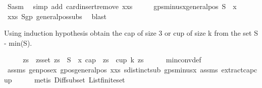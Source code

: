 \begin{isabellebody}
\ S{\isacharunderscore}{\kern0pt}asm\ \isamarkupfalse%
\ {\isacharparenleft}{\kern0pt}simp\ add{\isacharcolon}{\kern0pt}\ card{\isachardot}{\kern0pt}insert{\isacharunderscore}{\kern0pt}remove\ x{\isacharunderscore}{\kern0pt}xs{\isacharparenleft}{\kern0pt}{}{\isacharparenright}{\kern0pt}{\isacharparenright}{\kern0pt}\isanewline
\ \ \isamarkupfalse%
\ \isamarkupfalse%
\ gp{\isacharunderscore}{\kern0pt}sminus{\isacharunderscore}{\kern0pt}x{\isacharcolon}{\kern0pt}{\isachardoublequoteopen}general{\isacharunderscore}{\kern0pt}pos\ {\isacharparenleft}{\kern0pt}S\ {\isacharminus}{\kern0pt}\ {\isacharbraceleft}{\kern0pt}x{\isacharbraceright}{\kern0pt}{\isacharparenright}{\kern0pt}{\isachardoublequoteclose}\ \isamarkupfalse%
\ x{\isacharunderscore}{\kern0pt}xs{\isacharparenleft}{\kern0pt}{}{\isacharparenright}{\kern0pt}\ S{\isacharunderscore}{\kern0pt}gp\ general{\isacharunderscore}{\kern0pt}pos{\isacharunderscore}{\kern0pt}subs\ \isamarkupfalse%
\ blast%
\begin{isamarkuptext}%
Using induction hypothesis obtain the cap of size 3 or cup of size k from the set S - {min(S)}.%
\end{isamarkuptext}\isamarkuptrue%
\ \ \isamarkupfalse%
\ \isamarkupfalse%
\ zs\ \ zs{\isacharcolon}{\kern0pt}{\isachardoublequoteopen}set\ zs\ {\isasymsubseteq}\ S\ {\isacharminus}{\kern0pt}\ {\isacharbraceleft}{\kern0pt}x{\isacharbraceright}{\kern0pt}{\isachardoublequoteclose}\ {\isachardoublequoteopen}{\isacharparenleft}{\kern0pt}cap\ {}\ zs\ {\isasymor}\ cup\ k\ zs{\isacharparenright}{\kern0pt}{\isachardoublequoteclose}\isanewline
\ \ \ \ \isamarkupfalse%
\ min{\isacharunderscore}{\kern0pt}conv{\isacharunderscore}{\kern0pt}def\ \isanewline
\ \ \ \ \isamarkupfalse%
\ assms\ genpos{\isacharunderscore}{\kern0pt}ex\ gpos{\isacharunderscore}{\kern0pt}generalpos\ x{\isacharunderscore}{\kern0pt}xs\ sdistinct{\isacharunderscore}{\kern0pt}sub\ gp{\isacharunderscore}{\kern0pt}sminus{\isacharunderscore}{\kern0pt}x\ assms{\isacharparenleft}{\kern0pt}{}{\isacharparenright}{\kern0pt}\ extract{\isacharunderscore}{\kern0pt}cap{\isacharunderscore}{\kern0pt}cup\isanewline
\ \ \ \ \isamarkupfalse%
\ {\isacharparenleft}{\kern0pt}metis\ Diff{\isacharunderscore}{\kern0pt}subset\ List{\isachardot}{\kern0pt}finite{\isacharunderscore}{\kern0pt}set{\isacharparenright}{\kern0pt}\isanewline

\end{isabellebody}
